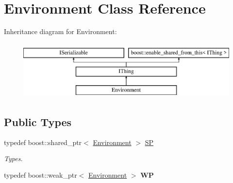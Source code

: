\hypertarget{class_environment}{}\section{Environment Class Reference}
\label{class_environment}
Inheritance diagram for Environment\+:\begin{figure}[H]
\begin{center}
\leavevmode
\includegraphics[height=3.000000cm]{class_environment}
\end{center}
\end{figure}
\subsection*{Public Types}
\begin{DoxyCompactItemize}
\item 
\mbox{\label{class_environment_aedaf5e37c31f4aaab9d9b04b15000181}} 
typedef boost\+::shared\+\_\+ptr$<$ \hyperlink{class_environment}{Environment} $>$ \hyperlink{class_environment_aedaf5e37c31f4aaab9d9b04b15000181}{SP}
\begin{DoxyCompactList}\small\item\em Types. \end{DoxyCompactList}\item 
\mbox{\label{class_environment_a026424718965a2c1e5b8e9f296af6266}} 
typedef boost\+::weak\+\_\+ptr$<$ \hyperlink{class_environment}{Environment} $>$ {\bfseries WP}
\end{DoxyCompactItemize}
